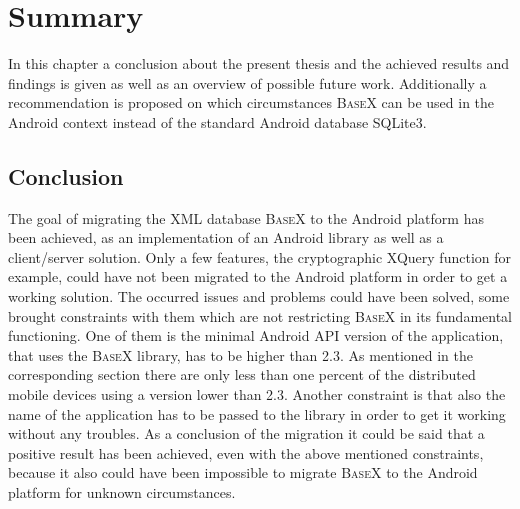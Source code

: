 \chapter{Summary}
\label{cha:summery}
In this chapter a conclusion about the present thesis and the achieved results and findings is given as well as an overview of possible future work.
Additionally a recommendation is proposed on which circumstances \textsc{BaseX} can be used in the Android context instead of the standard Android database SQLite3.
\section{Conclusion}
\label{sec:summery:conclusion}
The goal of migrating the XML database \textsc{BaseX} to the Android platform has been achieved, as an implementation of an Android library as well as a client/server solution.
Only a few features, the cryptographic XQuery function for example, could have not been migrated to the Android platform in order to get a working solution.
The occurred issues and problems could have been solved, some brought constraints with them which are not restricting \textsc{BaseX} in its fundamental functioning.
One of them is the minimal Android API version of the application, that uses the \textsc{BaseX} library, has to be higher than 2.3.
As mentioned in the corresponding section there are only less than one percent of the distributed mobile devices using a version lower than 2.3.
Another constraint is that also the name of the application has to be passed to the library in order to get it working without any troubles.
As a conclusion of the migration it could be said that a positive result has been achieved, even with the above mentioned constraints, because it also could have been impossible to migrate \textsc{BaseX} to the Android platform for unknown circumstances.





